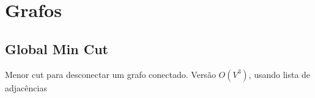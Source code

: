 \section{Grafos}

\subsection{Global Min Cut}
Menor cut para desconectar um grafo conectado. Vers\~{a}o $O(V^3)$, usando lista de adjac\^{e}ncias
\divisor
